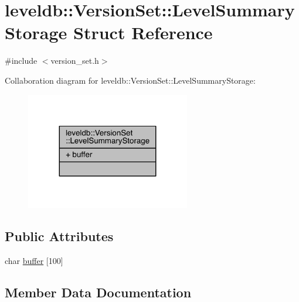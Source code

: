 \hypertarget{structleveldb_1_1_version_set_1_1_level_summary_storage}{}\section{leveldb\+:\+:Version\+Set\+:\+:Level\+Summary\+Storage Struct Reference}
\label{structleveldb_1_1_version_set_1_1_level_summary_storage}


{\ttfamily \#include $<$version\+\_\+set.\+h$>$}



Collaboration diagram for leveldb\+:\+:Version\+Set\+:\+:Level\+Summary\+Storage\+:\nopagebreak
\begin{figure}[H]
\begin{center}
\leavevmode
\includegraphics[width=203pt]{structleveldb_1_1_version_set_1_1_level_summary_storage__coll__graph}
\end{center}
\end{figure}
\subsection*{Public Attributes}
\begin{DoxyCompactItemize}
\item 
char \hyperlink{structleveldb_1_1_version_set_1_1_level_summary_storage_a90b283461affa0f25f41bc21a9c81bbc}{buffer} \mbox{[}100\mbox{]}
\end{DoxyCompactItemize}


\subsection{Member Data Documentation}
\hypertarget{structleveldb_1_1_version_set_1_1_level_summary_storage_a90b283461affa0f25f41bc21a9c81bbc}{}
